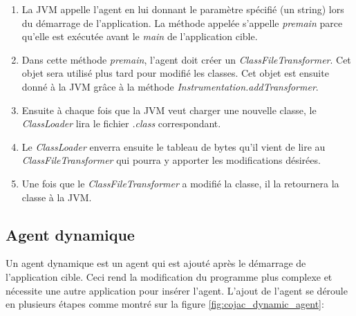 \begin{enumerate}
    \item La JVM appelle l'agent en lui donnant le paramètre spécifié (un string) lors du démarrage de l'application. La méthode appelée s'appelle \textit{premain} parce qu'elle est exécutée avant le \textit{main} de l'application cible.
    \item Dans cette méthode \textit{premain}, l'agent doit créer un \textit{ClassFileTransformer}. Cet objet sera utilisé plus tard pour modifié les classes. Cet objet est ensuite donné à la JVM grâce à la méthode \textit{Instrumentation.addTransformer}.
    \item Ensuite à chaque fois que la JVM veut charger une nouvelle classe, le \textit{ClassLoader} lira le fichier \textit{.class} correspondant.
    \item Le \textit{ClassLoader} enverra ensuite le tableau de bytes qu'il vient de lire au \textit{ClassFileTransformer} qui pourra y apporter les modifications désirées.
    \item Une fois que le \textit{ClassFileTransformer} a modifié la classe, il la retournera la classe à la JVM.
\end{enumerate}

\begin{minipage}{\linewidth}%
\label{fig:cojac_static_agent}
\end{minipage}

\subsection{Agent dynamique}

Un agent dynamique est un agent qui est ajouté après le démarrage de l'application cible. Ceci rend la modification du programme plus complexe et nécessite une autre application pour insérer l'agent. L'ajout de l'agent se déroule en plusieurs étapes comme montré sur la figure \ref{fig:cojac_dynamic_agent}:

